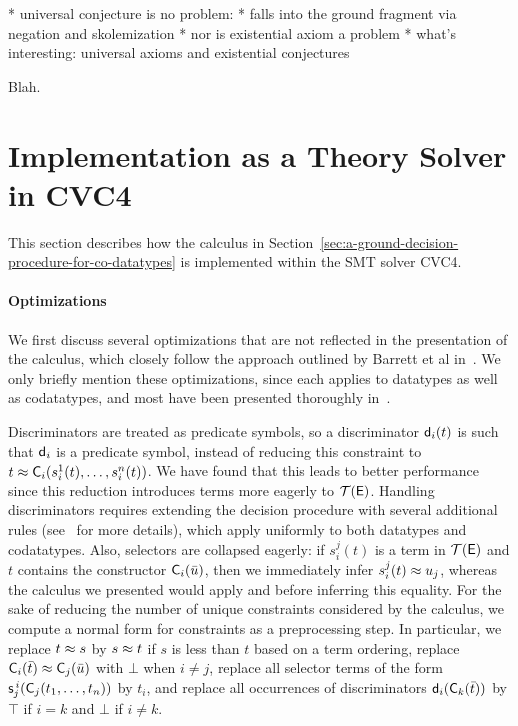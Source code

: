   * universal conjecture is no problem:
    * falls into the ground fragment via negation
      and skolemization
  * nor is existential axiom a problem
  * what's interesting: universal axioms and existential conjectures

Blah.

\section{Implementation as a Theory Solver in CVC4}
\label{sec:the-theory-solver}

This section describes how the calculus in Section~\ref{sec:a-ground-decision-procedure-for-co-datatypes} is implemented within the SMT solver CVC4.

\paragraph{Optimizations}
We first discuss several optimizations that are not reflected in the presentation of the calculus, which closely follow the approach outlined by Barrett et al in~\cite{}.
We only briefly mention these optimizations, since each applies to datatypes as well as codatatypes, and most have been presented thoroughly in~\cite{}.

Discriminators are treated as predicate symbols, so a discriminator $\textsf{d}_i( t )$ is such that $\textsf{d}_i$ 
is a predicate symbol, instead of reducing this constraint to $t \approx \textsf{C}_i( s^1_i( t ), \ldots, s^n_i( t ) )$.
We have found that this leads to better performance since this reduction introduces terms more eagerly to $\mathcal{T}(\mathsf{E})$.
Handling discriminators requires extending the decision procedure with several additional rules (see~\cite{} for more details), which apply uniformly to both datatypes and codatatypes.
Also, selectors are collapsed eagerly:
if $s^j_i( t )$ is a term in $\mathcal{T}(\mathsf{E})$ and $t$ contains the constructor 
$\textsf{C}_i( \bar u )$, then we immediately infer $s^j_i( t ) \approx u_j$, whereas the calculus we presented would apply  and  before inferring this equality.  
For the sake of reducing the number of unique constraints considered by the calculus, we compute a normal form for constraints as a preprocessing step.
In particular, we 
replace $t \approx s$ by $s \approx t$ if $s$ is less than $t$ based on a term ordering,
replace $\textsf{C}_i( \bar t ) \approx \textsf{C}_j( \bar u )$ with $\bot$ when $i \neq j$,
replace all selector terms of the form $\textsf{s}^{\,i}_j( \textsf{C}_j(t_1,\ldots,t_n) )$ by $t_i$,
and replace all occurrences of discriminators $\textsf{d}_i( \textsf{C}_k( \bar t ) )$ by $\top$ if $i=k$ and $\bot$ if $i \neq k$.

